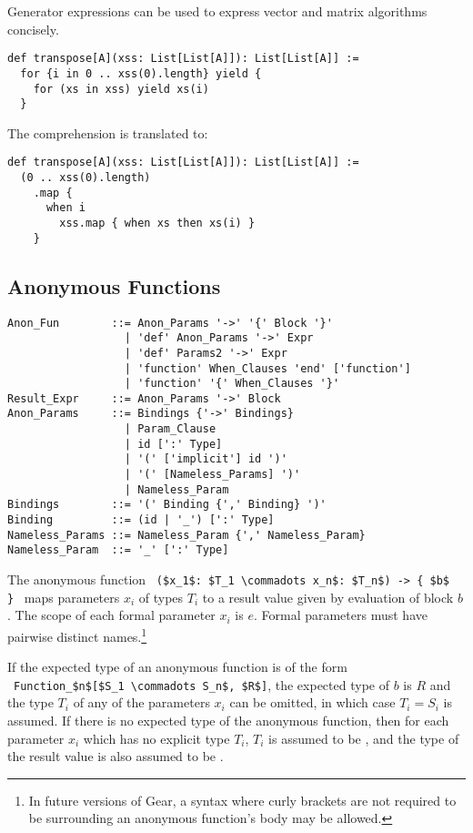 \example Generator expressions can be used to express vector and matrix algorithms concisely.
\begin{lstlisting}
def transpose[A](xss: List[List[A]]): List[List[A]] :=
  for {i in 0 .. xss(0).length} yield {
    for (xs in xss) yield xs(i)
  }
\end{lstlisting} 
The comprehension is translated to: 
\begin{lstlisting}
def transpose[A](xss: List[List[A]]): List[List[A]] := 
  (0 .. xss(0).length)
    .map { 
      when i 
        xss.map { when xs then xs(i) }
    }
\end{lstlisting}






\subsection{Anonymous Functions}
\label{sec:anonymous-functions}

\syntax\begin{lstlisting}
Anon_Fun        ::= Anon_Params '->' '{' Block '}'
                  | 'def' Anon_Params '->' Expr
                  | 'def' Params2 '->' Expr
                  | 'function' When_Clauses 'end' ['function']
                  | 'function' '{' When_Clauses '}'
Result_Expr     ::= Anon_Params '->' Block 
Anon_Params     ::= Bindings {'->' Bindings}
                  | Param_Clause
                  | id [':' Type]
                  | '(' ['implicit'] id ')'
                  | '(' [Nameless_Params] ')'
                  | Nameless_Param
Bindings        ::= '(' Binding {',' Binding} ')'
Binding         ::= (id | '_') [':' Type]
Nameless_Params ::= Nameless_Param {',' Nameless_Param}
Nameless_Param  ::= '_' [':' Type]
\end{lstlisting}

The anonymous function ~\lstinline!($x_1$: $T_1 \commadots x_n$: $T_n$) -> { $b$ }!~ maps parameters $x_i$ of types $T_i$ to a result value given by evaluation of block $b$. The scope of each formal parameter $x_i$ is $e$. Formal parameters must have pairwise distinct names.\footnote{In future versions of Gear, a syntax where curly brackets are not required to be surrounding an anonymous function's body may be allowed.}

If the expected type of an anonymous function is of the form ~\lstinline!Function_$n$[$S_1 \commadots S_n$, $R$]!, the expected type of $b$ is $R$ and the type $T_i$ of any of the parameters $x_i$ can be omitted, in which case $T_i = S_i$ is assumed. If there is no expected type of the anonymous function, then for each parameter $x_i$ which has no explicit type $T_i$, $T_i$ is assumed to be , and the type of the result value is also assumed to be . 

